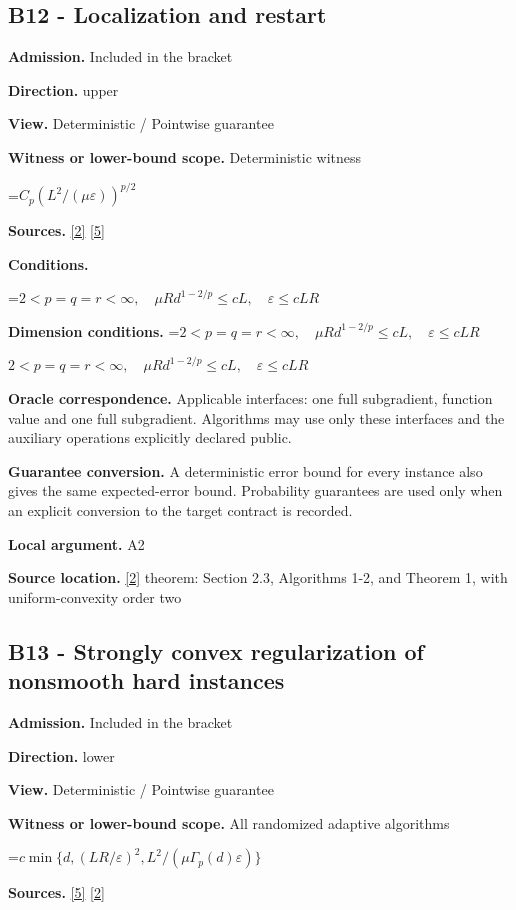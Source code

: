 \documentclass[10pt,a4paper]{article}
\newcommand{\AtlasMath}[1]{\par\begingroup\centering\setbox0=\hbox{$\displaystyle #1$}\ifdim\wd0>1.4\linewidth\typeout{ATLAS WIDE FORMULA: \the\wd0}\fi\ifdim\wd0>\linewidth\resizebox{\linewidth}{!}{\box0}\else\box0\fi\par\endgroup}
\newcommand{\AtlasInlineMath}[1]{\begingroup\setbox0=\hbox{$#1$}\ifdim\wd0>.4\linewidth\endgroup\AtlasMath{#1}\else\endgroup$#1$\fi}
\begin{document}
\subsection{B12 - Localization and restart}
\textbf{Admission.} Included in the bracket

\textbf{Direction.} upper

\textbf{View.} Deterministic / Pointwise guarantee

\textbf{Witness or lower-bound scope.} Deterministic witness

\AtlasMath{C_p(L^2/(\mu\varepsilon))^{p/2}}
\textbf{Sources.} \href{https://arxiv.org/pdf/1401.1792}{[2]} \href{https://arxiv.org/pdf/1407.5144}{[5]}

\textbf{Conditions.} 
\AtlasMath{2<p=q=r<\infty,\quad\mu R d^{1-2/p}\le cL,\quad\varepsilon\le cLR}


\textbf{Dimension conditions.} \AtlasInlineMath{2<p=q=r<\infty,\quad\mu R d^{1-2/p}\le cL,\quad\varepsilon\le cLR}

\textbf{Oracle correspondence.} Applicable interfaces: one full subgradient, function value and one full subgradient. Algorithms may use only these interfaces and the auxiliary operations explicitly declared public.

\textbf{Guarantee conversion.} A deterministic error bound for every instance also gives the same expected-error bound. Probability guarantees are used only when an explicit conversion to the target contract is recorded.

\textbf{Local argument.} A2

\textbf{Source location.} \href{https://arxiv.org/pdf/1401.1792}{[2]} theorem: Section 2.3, Algorithms 1-2, and Theorem 1, with uniform-convexity order two

\subsection{B13 - Strongly convex regularization of nonsmooth hard instances}
\textbf{Admission.} Included in the bracket

\textbf{Direction.} lower

\textbf{View.} Deterministic / Pointwise guarantee

\textbf{Witness or lower-bound scope.} All randomized adaptive algorithms

\AtlasMath{c\min\{d,(LR/\varepsilon)^2,L^2/(\mu\Gamma_p(d)\varepsilon)\}}
\textbf{Sources.} \href{https://arxiv.org/pdf/1407.5144}{[5]} \href{https://arxiv.org/pdf/1401.1792}{[2]}
\end{document}
